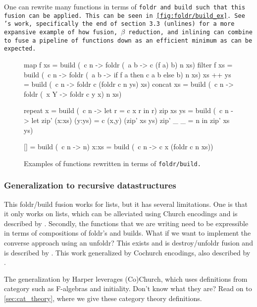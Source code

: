 One can rewrite many functions in terms of \tt{foldr} and \tt{build} such that this fusion can be applied. This can be seen in \autoref{fig:foldr/build_ex}.
See \cite{Gill1993}'s work, specifically the end of section 3.3 (\tt{unlines}) for a more expansive example of how fusion, $\beta$ reduction, and inlining can combine to fuse a pipeline of functions down as an efficient minimum as can be expected.
\begin{figure}[ht]
    \centering
    \begin{code}
map f xs    = build (\ c n -> foldr (\ a b -> c (f a) b) n xs)
filter f xs = build (\ c n -> foldr (\ a b -> if f a then c a b else b) n xs)
xs ++ ys    = build (\ c n -> foldr c (foldr c n ys) xs)
concat xs   = build (\ c n -> foldr (\ x Y -> foldr c y x) n xs)

repeat x    = build (\ c n -> let r = c x r in r)
zip xs ys   = build (\ c n -> let zip' (x:xs) (y:ys) = c (x,y) (zip' xs ys)
                                  zip' _      _      = n
                                  in zip' xs ys)

[]         = build (\ c n -> n)
x:xs       = build (\ c n -> c x (foldr c n xs))
    \end{code}
    \caption{Examples of functions rewritten in terms of \tt{foldr/build}. \citep{Gill1993}}
    \label{fig:foldr/build_ex}
\end{figure}



\subsubsection{Generalization to recursive datastructures}
This foldr/build fusion works for lists, but it has several limitations.
One is that it only works on lists, which can be alleviated using Church encodings and is described by \cite{Harper2011}.
Secondly, the functions that we are writing need to be expressible in terms of compositions of foldr's and builds. What if we want to implement the converse approach using an unfoldr?
This exists and is destroy/unfoldr fusion and is described by \cite{Coutts2007}.
This work generalized by Cochurch encodings, also described by \cite{Harper2011}.

The generalization by Harper leverages (Co)Church, which uses definitions from category such as F-algebras and initiality.
Don't know what they are? Read on to \autoref{sec:cat_theory}, where we give these category theory definitions.

